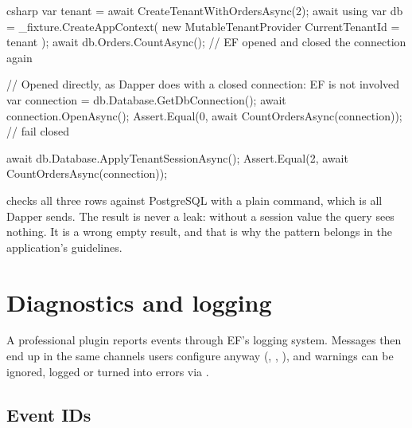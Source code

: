 \begin{sourcecode}{csharp}
var tenant = await CreateTenantWithOrdersAsync(2);
await using var db = _fixture.CreateAppContext(
    new MutableTenantProvider { CurrentTenantId = tenant });
await db.Orders.CountAsync();                 // EF opened and closed the connection again

// Opened directly, as Dapper does with a closed connection: EF is not involved
var connection = db.Database.GetDbConnection();
await connection.OpenAsync();
Assert.Equal(0, await CountOrdersAsync(connection));      // fail closed

await db.Database.ApplyTenantSessionAsync();
Assert.Equal(2, await CountOrdersAsync(connection));
\end{sourcecode}

 checks all three rows against PostgreSQL
with a plain command, which is all Dapper sends. The result is never a leak: without a
session value the query sees nothing. It is a wrong empty result, and that is why the pattern
belongs in the application's guidelines.

\chapter{Diagnostics and logging}\label{ch:diagnostics-and-logging}

A professional plugin reports events through EF's logging system. Messages then end up in
the same channels users configure anyway (, ,
), and warnings can be ignored, logged or turned into
errors via .

\section{Event IDs}

